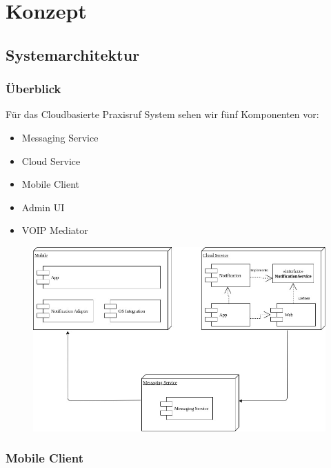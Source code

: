 \section{Konzept}\label{sec:konzept}

\subsection{Systemarchitektur}\label{subsec:systemarchitektur}

\subsubsection*{Überblick}

    Für das Cloudbasierte Praxisruf System sehen wir fünf Komponenten vor: 

    \begin{itemize}
        \item Messaging Service
        \item Cloud Service
        \item Mobile Client
        \item Admin UI
        \item VOIP Mediator
    \end{itemize}


    \begin{figure}
    \centering
    \includegraphics[width=\linewidth]{graphics/IP5_POC_Cloud_Architecture}\label{fig:architecure}
    \end{figure}


    \subsubsection*{Mobile Client}

